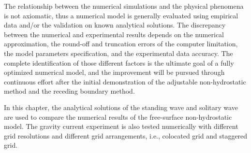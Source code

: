 \normalsize
The relationship between the numerical simulations and the physical phenomena is not axiomatic, thus a numerical model is generally evaluated using empirical data and/or the validation on known analytical solutions. The discrepancy between the numerical and experimental results depends on the numerical approximation, the round-off and truncation errors of the computer limitation, the model parameters specification, and the experimental data accuracy. The complete identification of those different factors is the ultimate goal of a fully optimized numerical model, and the improvement will be pursued through continuous effort after the initial demonstration of the adjustable non-hydrostatic method and the receding boundary method.

In this chapter, the analytical solutions of the standing wave and solitary wave are used to compare the numerical results of the free-surface non-hydrostatic model. The gravity current experiment \cite{Maxworthy02} is also tested numerically with different grid resolutions and different grid arrangements, i.e., colocated grid and staggered grid.





